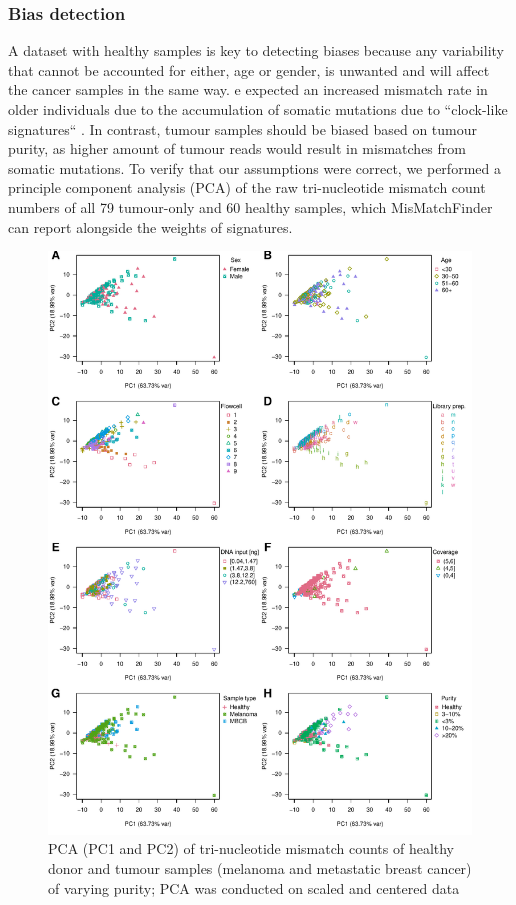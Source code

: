 \subsubsection{Bias detection}
\label{mmf-sec:healthyBias}
A dataset with healthy samples is key to detecting biases because any variability that cannot be accounted for either, age or gender, is unwanted and will affect the cancer samples in the same way. e expected an increased mismatch rate in  older individuals due to the accumulation of somatic mutations due to ``clock-like signatures`` \cite{Abascal2021}. In contrast, tumour samples should be biased based on tumour purity, as higher amount of tumour reads would result in  mismatches from somatic mutations.
To verify that our assumptions were correct, we performed a principle component analysis (PCA) of the raw tri-nucleotide mismatch count numbers of all 79 tumour-only and 60 healthy samples, which MisMatchFinder can report alongside the weights of signatures.

\begin{figure}[htp]
\centering
\includegraphics[width=.99\linewidth]{Figures/MisMatchFinder/countPCAsPC1vsPC2.pdf}
\caption[PCA of tri-nucleotide mismatch counts of real world data (PC1 and PC2)]{PCA (PC1 and PC2) of tri-nucleotide mismatch counts of healthy donor and tumour samples (melanoma and metastatic breast cancer) of varying purity; PCA was conducted on scaled and centered data}\label{fig:mmf-pca1v2}
\end{figure}


